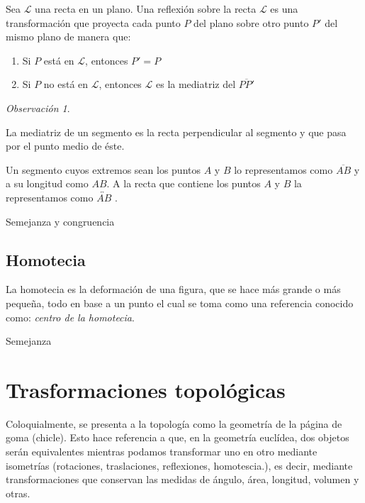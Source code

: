 \documentclass[16pt,]{krantz}
\theoremstyle{definition}
\theoremstyle{definition}
\theoremstyle{definition}
\theoremstyle{definition}
\theoremstyle{remark}
\newtheorem*{remark}{Observación}
\begin{document}
Sea \(\mathcal{L}\) una recta en un plano. Una reflexión sobre la recta \(\mathcal{L}\) es una transformación que proyecta cada punto \(P\) del plano sobre otro punto \(P'\) del mismo plano de manera que:

\begin{enumerate}
\def\labelenumi{\arabic{enumi}.}
\item
  Si \(P\) está en \(\mathcal{L}\), entonces \(P'=P\)
\item
  Si \(P\) no está en \(\mathcal{L}\), entonces \(\mathcal{L}\) es la mediatriz del \(\overline{PP'}\)
\end{enumerate}

\begin{remark}
{}
\end{remark}

La mediatriz de un segmento es la recta perpendicular al segmento y que pasa por el punto medio de éste.

Un segmento cuyos extremos sean los puntos \(A\) y \(B\) lo representamos como \(\overline{AB}\) y a su longitud como \(AB\). A la recta que contiene los puntos \(A\) y \(B\) la representamos como \(\overleftrightarrow{AB}\) .

Semejanza y congruencia

\hypertarget{homotecia}{%
\subsection{Homotecia}\label{homotecia}}

La homotecia es la deformación de una figura, que se hace más grande o más pequeña, todo en base a un punto el cual se toma como una referencia conocido como: \emph{centro de la homotecia}.

Semejanza

\hypertarget{trasformaciones-topoluxf3gicas}{%
\section{Trasformaciones topológicas}\label{trasformaciones-topoluxf3gicas}}

Coloquialmente, se presenta a la topología como la geometría de la página de goma (chicle). Esto hace referencia a que, en la geometría euclídea, dos objetos serán equivalentes mientras podamos transformar uno en otro mediante isometrías (rotaciones, traslaciones, reflexiones, homotescia.), es decir, mediante transformaciones que conservan las medidas de ángulo, área, longitud, volumen y otras.
\end{document}
